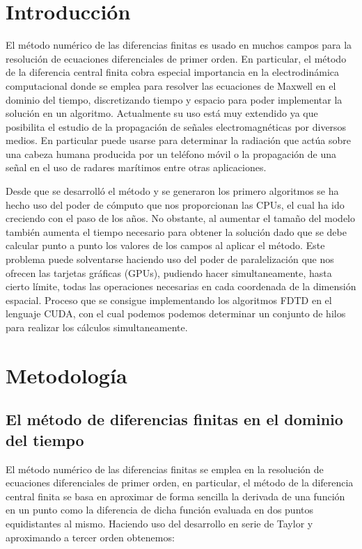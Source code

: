 \documentclass[11pt,a4paper,twoside,pdf]{article}
\numberwithin{equation}{section}
\begin{document}
\tableofcontents

\newpage

\pagestyle{fancy}
\fancyhead[RO,LE]{\leftmark}
\fancyhead[LO,RE]{\thepage}
\fancyfoot{}

\section{Introducción}
El método numérico de las diferencias finitas es usado en muchos campos para la resolución de ecuaciones diferenciales de primer orden. En particular, el método de la diferencia central finita cobra especial importancia en la electrodinámica computacional donde se emplea para resolver las ecuaciones de Maxwell en el dominio del tiempo, discretizando tiempo y espacio para poder implementar la solución en un algoritmo.
Actualmente su uso está muy extendido ya que posibilita el estudio de la propagación de señales electromagnéticas por diversos medios. En particular puede usarse para determinar la radiación que actúa sobre una cabeza humana producida por un teléfono móvil o la propagación de una señal en el uso de radares marítimos entre otras aplicaciones.

Desde que se desarrolló el método y se generaron los primero algoritmos se ha hecho uso del poder de cómputo que nos proporcionan las CPUs, el cual ha ido creciendo con el paso de los años. No obstante, al aumentar el tamaño del modelo también aumenta el tiempo necesario para obtener la solución dado que se debe calcular punto a punto los valores de los campos al aplicar el método. Este problema puede solventarse haciendo uso del poder de paralelización que nos ofrecen las tarjetas gráficas (GPUs), pudiendo hacer simultaneamente, hasta cierto límite, todas las operaciones necesarias en cada coordenada de la dimensión espacial. Proceso que se consigue implementando los algoritmos FDTD en el lenguaje CUDA, con el cual podemos podemos determinar un conjunto de hilos para realizar los cálculos simultaneamente.








\section{Metodología}
\subsection{El método de diferencias finitas en el dominio del tiempo}
El método numérico de las diferencias finitas se emplea en la resolución de ecuaciones diferenciales de primer orden, en particular, el método de la diferencia central finita se basa en aproximar de forma sencilla la derivada de una función en un punto como la diferencia de dicha función evaluada en dos puntos equidistantes al mismo. Haciendo uso del desarrollo en serie de Taylor y aproximando a tercer orden obtenemos:
\end{document}
